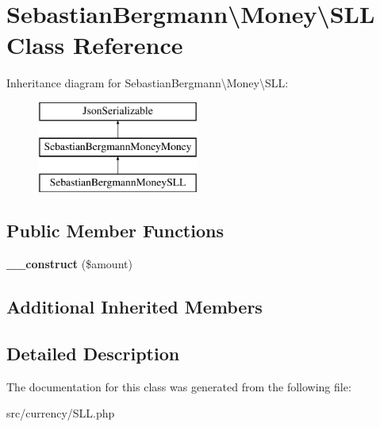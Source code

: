 \hypertarget{classSebastianBergmann_1_1Money_1_1SLL}{}\section{Sebastian\+Bergmann\textbackslash{}Money\textbackslash{}S\+L\+L Class Reference}
\label{classSebastianBergmann_1_1Money_1_1SLL}
Inheritance diagram for Sebastian\+Bergmann\textbackslash{}Money\textbackslash{}S\+L\+L\+:\begin{figure}[H]
\begin{center}
\leavevmode
\includegraphics[height=3.000000cm]{classSebastianBergmann_1_1Money_1_1SLL}
\end{center}
\end{figure}
\subsection*{Public Member Functions}
\begin{DoxyCompactItemize}
\item 
\hypertarget{classSebastianBergmann_1_1Money_1_1SLL_a4a9b3ed6d1a969ad55ad207ab43944a3}{}{\bfseries \+\_\+\+\_\+construct} (\$amount)\label{classSebastianBergmann_1_1Money_1_1SLL_a4a9b3ed6d1a969ad55ad207ab43944a3}

\end{DoxyCompactItemize}
\subsection*{Additional Inherited Members}


\subsection{Detailed Description}


The documentation for this class was generated from the following file\+:\begin{DoxyCompactItemize}
\item 
src/currency/S\+L\+L.\+php\end{DoxyCompactItemize}
